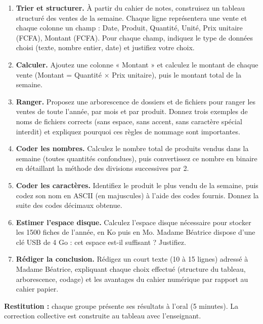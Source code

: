 \documentclass[11pt]{article}
\newcommand{\cle}[1]{{\popxbold\color{popdark}#1}}
\newcounter{popsec}
\newcounter{popsub}
\newcommand{\courssub}[1]{%
  \stepcounter{popsub}%
  \par\vspace{9pt}\noindent{\popxbold\fontsize{11.5}{13}\selectfont\color{popink}{\color{poporange}\thepopsec.\thepopsub}\hspace{6pt}#1}\par\nopagebreak\vspace{4pt}
}
\begin{document}
\begin{enumerate}
\item \textbf{Trier et structurer.} À partir du cahier de notes, construisez un tableau structuré des ventes de la semaine. Chaque ligne représentera une vente et chaque colonne un champ : Date, Produit, Quantité, Unité, Prix unitaire (FCFA), Montant (FCFA). Pour chaque champ, indiquez le \cle{type de données} choisi (texte, nombre entier, date) et justifiez votre choix.
\item \textbf{Calculer.} Ajoutez une colonne « Montant » et calculez le montant de chaque vente (Montant = Quantité $\times$ Prix unitaire), puis le montant total de la semaine.
\item \textbf{Ranger.} Proposez une arborescence de dossiers et de fichiers pour ranger les ventes de toute l'année, par mois et par produit. Donnez trois exemples de noms de fichiers corrects (sans espace, sans accent, sans caractère spécial interdit) et expliquez pourquoi ces règles de nommage sont importantes.
\item \textbf{Coder les nombres.} Calculez le nombre total de produits vendus dans la semaine (toutes quantités confondues), puis convertissez ce nombre en binaire en détaillant la méthode des divisions successives par 2.
\item \textbf{Coder les caractères.} Identifiez le produit le plus vendu de la semaine, puis codez son nom en ASCII (en majuscules) à l'aide des codes fournis. Donnez la suite des codes décimaux obtenue.
\item \textbf{Estimer l'espace disque.} Calculez l'espace disque nécessaire pour stocker les \num{1500} fiches de l'année, en Ko puis en Mo. Madame Béatrice dispose d'une clé USB de 4 Go : cet espace est-il suffisant ? Justifiez.
\item \textbf{Rédiger la conclusion.} Rédigez un court texte (10 à 15 lignes) adressé à Madame Béatrice, expliquant chaque choix effectué (structure du tableau, arborescence, codage) et les avantages du cahier numérique par rapport au cahier papier.
\end{enumerate}

\textbf{Restitution :} chaque groupe présente ses résultats à l'oral (5 minutes). La correction collective est construite au tableau avec l'enseignant.

\courssub{Ressources à mobiliser}
\end{document}
